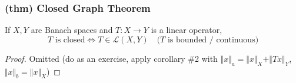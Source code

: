 \subsubsection{(thm) Closed Graph Theorem}
If $X,Y$ are Banach spaces and $T:X\to Y$ is a linear operator,
$$T\text{ is closed} \iff T\in \mathcal L(X,Y)\quad (T\text{ is bounded / continuous)}$$
\begin{proof}
    Omitted (do as an exercise, apply corollary \#2 with $\Vert x\Vert_a=\Vert x\Vert_X+\Vert Tx\Vert_Y$, $\Vert x\Vert_b=\Vert x\Vert_X$)
\end{proof}

